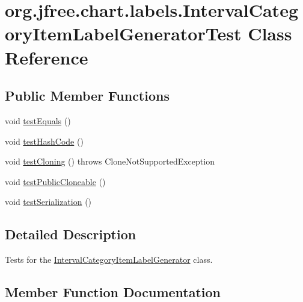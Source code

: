 \hypertarget{classorg_1_1jfree_1_1chart_1_1labels_1_1_interval_category_item_label_generator_test}{}\section{org.\+jfree.\+chart.\+labels.\+Interval\+Category\+Item\+Label\+Generator\+Test Class Reference}
\label{classorg_1_1jfree_1_1chart_1_1labels_1_1_interval_category_item_label_generator_test}
\subsection*{Public Member Functions}
\begin{DoxyCompactItemize}
\item 
void \mbox{\hyperlink{classorg_1_1jfree_1_1chart_1_1labels_1_1_interval_category_item_label_generator_test_a065708e6763e0c8044dfdb89bbc88c29}{test\+Equals}} ()
\item 
void \mbox{\hyperlink{classorg_1_1jfree_1_1chart_1_1labels_1_1_interval_category_item_label_generator_test_a87818ac780162886b90efce3116309d7}{test\+Hash\+Code}} ()
\item 
void \mbox{\hyperlink{classorg_1_1jfree_1_1chart_1_1labels_1_1_interval_category_item_label_generator_test_aed9a1cfd68acfdfb411a83e86b932b29}{test\+Cloning}} ()  throws Clone\+Not\+Supported\+Exception 
\item 
void \mbox{\hyperlink{classorg_1_1jfree_1_1chart_1_1labels_1_1_interval_category_item_label_generator_test_ab59fffcc47eb2ba5bd0de7422cb95553}{test\+Public\+Cloneable}} ()
\item 
void \mbox{\hyperlink{classorg_1_1jfree_1_1chart_1_1labels_1_1_interval_category_item_label_generator_test_a3af57fbc8b720429860b8ff9fbd50c5e}{test\+Serialization}} ()
\end{DoxyCompactItemize}


\subsection{Detailed Description}
Tests for the \mbox{\hyperlink{classorg_1_1jfree_1_1chart_1_1labels_1_1_interval_category_item_label_generator}{Interval\+Category\+Item\+Label\+Generator}} class. 

\subsection{Member Function Documentation}
\mbox{\label{classorg_1_1jfree_1_1chart_1_1labels_1_1_interval_category_item_label_generator_test_aed9a1cfd68acfdfb411a83e86b932b29}} 
